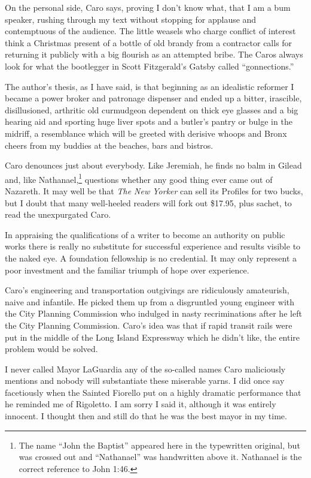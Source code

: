 \documentclass[11pt,letterpaper]{article}
\begin{document}
On the personal side, Caro says, proving I don't know what, that I am a bum speaker, rushing through my text without stopping for applause and contemptuous of the audience. The little weasels who charge conflict of interest think a Christmas present of a bottle of old brandy from a contractor calls for returning it publicly with a big flourish as an attempted bribe. The Caros always look for what the bootlegger in Scott Fitzgerald's Gatsby called \enquote{gonnections.}

The author's thesis, as I have said, is that beginning as an idealistic reformer I became a power broker and patronage dispenser and ended up a bitter, irascible, disillusioned, arthritic old curmudgeon dependent on thick eye glasses and a big hearing aid and sporting huge liver spots and a butler's pantry or bulge in the midriff, a resemblance which will be greeted with derisive whoops and Bronx cheers from my buddies at the beaches, bars and bistros.

Caro denounces just about everybody. Like Jeremiah, he finds no balm in Gilead and, like Nathanael,\footnote{The name \enquote{John the Baptist} appeared here in the typewritten original, but was crossed out and \enquote{Nathanael} was handwritten above it. Nathanael is the correct reference to John 1:46.} questions whether any good thing ever came out of Nazareth. It may well be that \textit{The New Yorker} can sell its Profiles for two bucks, but I doubt that many well-heeled readers will fork out \$17.95, plus sachet, to read the unexpurgated Caro.

In appraising the qualifications of a writer to become an authority on public works there is really no substitute for successful experience and results visible to the naked eye. A foundation fellowship is no credential. It may only represent a poor investment and the familiar triumph of hope over experience.

Caro's engineering and transportation outgivings are ridiculously amateurish, naive and infantile. He picked them up from a disgruntled young engineer with the City Planning Commission who indulged in nasty recriminations after he left the City Planning Commission. Caro's idea was that if rapid transit rails were put in the middle of the Long Island Expressway which he didn't like, the entire problem would be solved.

I never called Mayor LaGuardia any of the so-called names Caro maliciously mentions and nobody will substantiate these miserable yarns. I did once say facetiously when the Sainted Fiorello put on a highly dramatic performance that he reminded me of Rigoletto. I am sorry I said it, although it was entirely innocent. I thought then and still do that he was the best mayor in my time.
\end{document}
